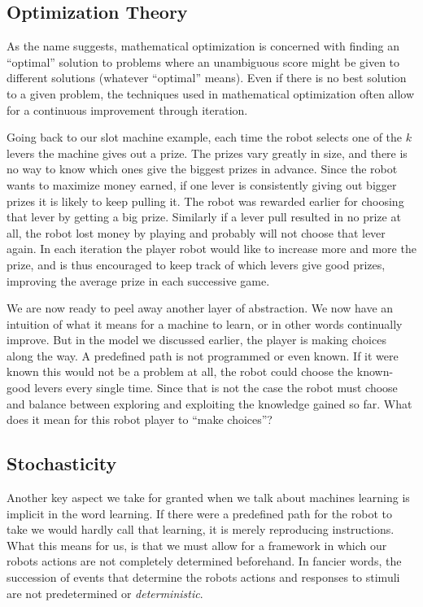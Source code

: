 \subsection{Optimization Theory}
As the name suggests, mathematical optimization is concerned 
with finding an ``optimal'' solution to problems where an 
unambiguous score might be given to different solutions  
(whatever ``optimal'' means). Even if there is no best solution 
to a given problem, the techniques used in mathematical 
optimization often allow for a continuous improvement through 
iteration.

Going back to our slot machine example, each time the robot 
selects one of the $k$ levers the machine gives out a prize. 
The prizes vary greatly in size, and there is no way to know 
which ones give the biggest prizes in advance. Since the robot 
wants to maximize money earned, if one lever is consistently 
giving out bigger prizes it is likely to keep pulling it. The 
robot was rewarded earlier for choosing that lever by getting a 
big prize.  Similarly if a lever pull resulted in no prize at 
all, the robot lost money by playing and probably will not 
choose that lever again. In each iteration the player robot 
would like to increase more and more the prize, and is thus  
encouraged to keep track of which levers give good prizes, 
improving the average prize in each successive game.

We are now ready to peel away another layer of abstraction.  We 
now have an intuition of what it means for a machine to learn, 
or in other words continually improve. But in the model we 
discussed earlier, the player is making choices along the way. 
A predefined path is not programmed or even known. If it were 
known this would not be a problem at all, the robot could 
choose the known-good levers every single time. Since that is 
not the case the robot must choose and balance between 
exploring and exploiting the knowledge gained so far. What does 
it mean for this robot player to ``make choices''?

\subsection{Stochasticity}
Another key aspect we take for granted when we talk about 
machines learning is implicit in the word learning. If there 
were a predefined path for the robot to take we would hardly 
call that learning, it is merely reproducing instructions.  
What this means for us, is that we must allow for a framework 
in which our robots actions are not completely determined 
beforehand. In fancier words, the succession of events that 
determine the robots actions and responses to stimuli are not 
predetermined or \textit{deterministic}.

